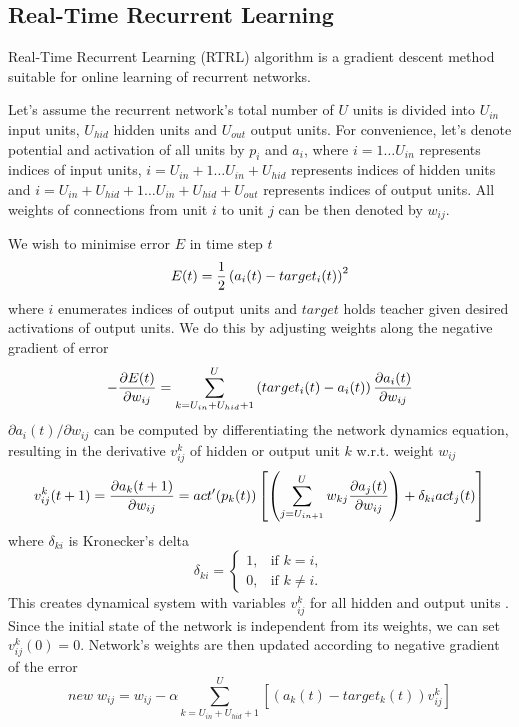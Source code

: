 \documentclass[12pt,oneside]{fithesis2}
\begin{document}
\subsection{Real-Time Recurrent Learning}
Real-Time Recurrent Learning (RTRL) algorithm is a gradient descent method suitable for online learning of recurrent networks.\par

Let's assume the recurrent network's total number of $U$ units is divided into $U_{in}$ input units, $U_{hid}$ hidden units and $U_{out}$ output units. For convenience, let's denote potential and activation of all units by $p_i$ and $a_i$, where $i=1 \dots U_{in}$ represents indices of input units, $i=U_{in} + 1 \dots U_{in} + U_{hid}$ represents indices of hidden units and $i=U_{in} + U_{hid} + 1 \dots U_{in} + U_{hid} + U_{out}$ represents indices of output units. All weights of connections from unit $i$ to unit $j$ can be then denoted by $w_{ij}$.\par

We wish to minimise error $E$ in time step $t$ %
$$E(t) = {1 \over 2}\left(a_i(t) - target_i(t)\right)^2$$
where $i$ enumerates indices of output units and $target$ holds teacher given desired activations of output units. We do this by adjusting weights along the negative gradient of error
$$-{{\partial E(t)} \over {\partial w_{ij}}} = \sum\limits_{k=U_{in}+U_{hid}+1}^U \left( target_i(t) - a_i(t) \right) {{\partial a_i(t)} \over {\partial w_{ij}}}$$
${\partial a_i(t)} / {\partial w_{ij}}$ can be computed by differentiating the network dynamics equation, resulting in the derivative $v^k_{ij}$ of hidden or output unit $k$ w.r.t. weight $w_{ij}$
$$ v^k_{ij}(t+1) = {{\partial a_k(t+1)} \over {\partial w_{ij}}} = act'(p_k(t)) \left[ \left(\sum\limits_{j=U_{in+1}}^{U}  w_{kj} {{\partial a_j(t)} \over {\partial w_{ij}}}\right) + \delta_{ki} act_j(t) \right] $$
where $\delta_{ki}$ is Kronecker's delta
$$\delta_{ki} =
    \begin{cases}
            1, &         \text{if } k=i,\\
            0, &         \text{if } k\neq i.
    \end{cases}$$
This creates dynamical system with variables $v^k_{ij}$ for all hidden and output units \cite{williams-zipser}. Since the initial state of the network is independent from its weights, we can set $v^k_{ij}(0) = 0$. Network's weights are then updated according to negative gradient of the error
$$new \; w_{ij} =  w_{ij} - \alpha \sum\limits_{k=U_{in}+U_{hid}+1}^U \left[ \left(a_k(t) - target_k(t) \right) v_{ij}^k \right]$$
\end{document}
